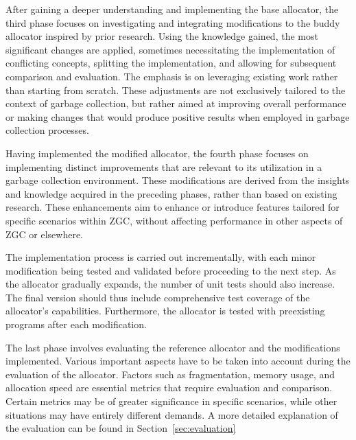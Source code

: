 
After gaining a deeper understanding and implementing the base allocator, the third phase focuses on investigating and integrating modifications to the buddy allocator inspired by prior research. Using the knowledge gained, the most significant changes are applied, sometimes necessitating the implementation of conflicting concepts, splitting the implementation, and allowing for subsequent comparison and evaluation. The emphasis is on leveraging existing work rather than starting from scratch. These adjustments are not exclusively tailored to the context of garbage collection, but rather aimed at improving overall performance or making changes that would produce positive results when employed in garbage collection processes.

Having implemented the modified allocator, the fourth phase focuses on implementing distinct improvements that are relevant to its utilization in a garbage collection environment. These modifications are derived from the insights and knowledge acquired in the preceding phases, rather than based on existing research. These enhancements aim to enhance or introduce features tailored for specific scenarios within ZGC, without affecting performance in other aspects of ZGC or elsewhere.

The implementation process is carried out incrementally, with each minor modification being tested and validated before proceeding to the next step. As the allocator gradually expands, the number of unit tests should also increase. The final version should thus include comprehensive test coverage of the allocator's capabilities. Furthermore, the allocator is tested with preexisting programs after each modification.

The last phase involves evaluating the reference allocator and the modifications implemented. Various important aspects have to be taken into account during the evaluation of the allocator. Factors such as fragmentation, memory usage, and allocation speed are essential metrics that require evaluation and comparison. Certain metrics may be of greater significance in specific scenarios, while other situations may have entirely different demands. A more detailed explanation of the evaluation can be found in Section~\ref{sec:evaluation}

